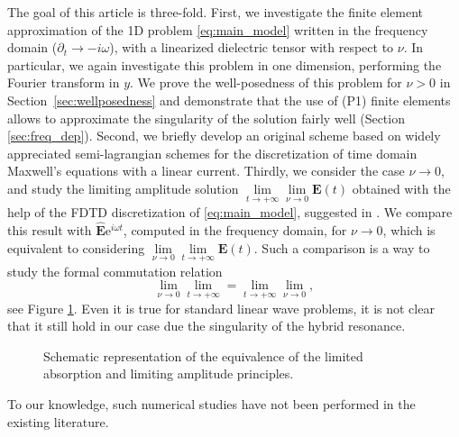 The goal of this article is three-fold. 
First, we investigate the finite element approximation of the 1D 
problem \eqref{eq:main_model} written in the frequency domain ($\partial_t\rightarrow -i\omega$), with a linearized dielectric tensor with respect to $\nu$.
In particular, we again investigate this problem in one dimension, performing the Fourier transform in $y$.
We prove the well-posedness of this problem for $\nu>0$ in Section~\ref{sec:wellposedness} and 
demonstrate that the use of  (P1) finite elements allows to approximate the singularity 
of the solution fairly well (Section \ref{sec:freq_dep}). 
Second, we briefly develop an original scheme based on widely appreciated semi-lagrangian schemes
for the discretization of time domain Maxwell's equations with a linear current.
Thirdly, we consider the case $\nu\rightarrow 0$, and study the limiting amplitude solution 
$\lim\limits_{t\rightarrow +\infty}\lim\limits_{\nu\rightarrow 0}\mathbf{E}(t)$ obtained with the help of 
the FDTD discretization of \eqref{eq:main_model}, suggested in \cite{stable_yee_plasma_current}. 
We compare this result with 
$\hat{\mathbf{E}}\mathrm{e}^{i\omega t}$, computed in the frequency domain, for $\nu\rightarrow 0$, which is equivalent to considering
$\lim\limits_{\nu\rightarrow 0}\lim\limits_{t\rightarrow+\infty}\mathbf{E}(t)$.
Such a comparison is a way to study the formal commutation relation
$$
\lim\limits_{\nu\rightarrow 0}\lim\limits_{t\rightarrow+\infty}= \lim\limits_{t\rightarrow+\infty}\lim\limits_{\nu\rightarrow 0},
$$
see Figure \ref{fig:limits}. 
Even it is true for standard linear wave problems, it is not clear that it still hold in our case due the singularity
of the hybrid resonance.
\begin{figure}
 \caption{Schematic representation of the equivalence of the limited absorption and limiting amplitude principles.}
\label{fig:limits}
\end{figure}

To our knowledge, such numerical studies have not been performed in the existing literature. 
